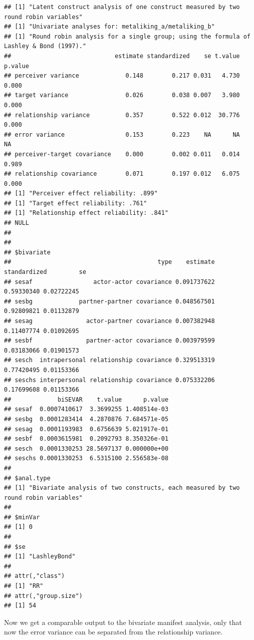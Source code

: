 \documentclass[a4paper]{article}\usepackage[]{graphicx}\usepackage[]{color}
\makeatletter
\newenvironment{kframe}{%
 \def\at@end@of@kframe{}%
 \ifinner\ifhmode%
  \def\at@end@of@kframe{\end{minipage}}%
  \begin{minipage}{\columnwidth}%
 \fi\fi%
 \def\FrameCommand##1{\hskip\@totalleftmargin \hskip-\fboxsep
 \colorbox{shadecolor}{##1}\hskip-\fboxsep
     \hskip-\linewidth \hskip-\@totalleftmargin \hskip\columnwidth}%
 \MakeFramed {\advance\hsize-\width
   \@totalleftmargin\z@ \linewidth\hsize
   \@setminipage}}%
 {\par\unskip\endMakeFramed%
 \at@end@of@kframe}
\newenvironment{knitrout}{}{} %
\makeatother
\begin{document}
\begin{knitrout}
\begin{kframe}
\begin{verbatim}
## [1] "Latent construct analysis of one construct measured by two round robin variables"
## [1] "Univariate analyses for: metaliking_a/metaliking_b"
## [1] "Round robin analysis for a single group; using the formula of Lashley & Bond (1997)."
##                             estimate standardized    se t.value p.value
## perceiver variance             0.148        0.217 0.031   4.730   0.000
## target variance                0.026        0.038 0.007   3.980   0.000
## relationship variance          0.357        0.522 0.012  30.776   0.000
## error variance                 0.153        0.223    NA      NA      NA
## perceiver-target covariance    0.000        0.002 0.011   0.014   0.989
## relationship covariance        0.071        0.197 0.012   6.075   0.000
## [1] "Perceiver effect reliability: .899"
## [1] "Target effect reliability: .761"
## [1] "Relationship effect reliability: .841"
## NULL
## 
## 
## $bivariate
##                                         type    estimate standardized         se
## sesaf                 actor-actor covariance 0.091737622   0.59330340 0.02722245
## sesbg             partner-partner covariance 0.048567501   0.92809821 0.01132879
## sesag               actor-partner covariance 0.007382948   0.11407774 0.01092695
## sesbf               partner-actor covariance 0.003979599   0.03183066 0.01901573
## sesch  intrapersonal relationship covariance 0.329513319   0.77420495 0.01153366
## seschs interpersonal relationship covariance 0.075332206   0.17699608 0.01153366
##             biSEVAR    t.value      p.value
## sesaf  0.0007410617  3.3699255 1.408514e-03
## sesbg  0.0001283414  4.2870876 7.684571e-05
## sesag  0.0001193983  0.6756639 5.021917e-01
## sesbf  0.0003615981  0.2092793 8.350326e-01
## sesch  0.0001330253 28.5697137 0.000000e+00
## seschs 0.0001330253  6.5315100 2.556583e-08
## 
## $anal.type
## [1] "Bivariate analysis of two constructs, each measured by two round robin variables"
## 
## $minVar
## [1] 0
## 
## $se
## [1] "LashleyBond"
## 
## attr(,"class")
## [1] "RR"
## attr(,"group.size")
## [1] 54
\end{verbatim}
\end{kframe}
\end{knitrout}

Now we get a comparable output to the bivariate manifest analysis, only that now the error variance can be separated from the relationship variance.
\end{document}
